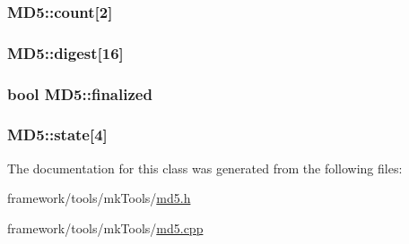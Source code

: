 \subsubsection[{\texorpdfstring{count}{count}}]{ M\+D5\+::count\mbox{[}2\mbox{]}\hspace{0.3cm}{\ttfamily [private]}}\hypertarget{class_m_d5_a52a9ff26a3de9e831b17c1740aa5388a}{}\label{class_m_d5_a52a9ff26a3de9e831b17c1740aa5388a}
\subsubsection[{\texorpdfstring{digest}{digest}}]{ M\+D5\+::digest\mbox{[}16\mbox{]}\hspace{0.3cm}{\ttfamily [private]}}\hypertarget{class_m_d5_a31058e1dca10bbf29818bb5177ff02ac}{}\label{class_m_d5_a31058e1dca10bbf29818bb5177ff02ac}
\subsubsection[{\texorpdfstring{finalized}{finalized}}]{\setlength{\rightskip}{0pt plus 5cm}bool M\+D5\+::finalized\hspace{0.3cm}{\ttfamily [private]}}\hypertarget{class_m_d5_a696e995f7045cf0146a207c720386f9c}{}\label{class_m_d5_a696e995f7045cf0146a207c720386f9c}
\subsubsection[{\texorpdfstring{state}{state}}]{ M\+D5\+::state\mbox{[}4\mbox{]}\hspace{0.3cm}{\ttfamily [private]}}\hypertarget{class_m_d5_aae3f861952f5b129463f550170836db0}{}\label{class_m_d5_aae3f861952f5b129463f550170836db0}


The documentation for this class was generated from the following files\+:\begin{DoxyCompactItemize}
\item 
framework/tools/mk\+Tools/\hyperlink{md5_8h}{md5.\+h}\item 
framework/tools/mk\+Tools/\hyperlink{md5_8cpp}{md5.\+cpp}\end{DoxyCompactItemize}
